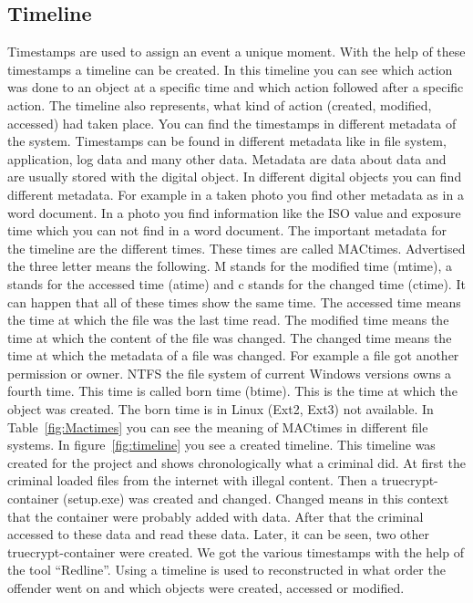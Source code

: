 
\subsection{Timeline}

Timestamps are used to assign an event a unique moment. With the help of these timestamps a timeline can be created. In this timeline you can see which action was done to an object at a specific time and which action followed after a specific action. The timeline also  represents, what kind of action (created, modified, accessed) had taken place. You can find the timestamps in different metadata of the system. Timestamps can be found in different metadata like in file system, application, log data and many other data. Metadata are data about data and are usually stored with the digital object. In different digital objects you can find different metadata. For example in a taken photo you find other metadata as in a word document. In a photo you find information like the ISO value and exposure time which you can not find in a word document. The important metadata for the timeline are the different times. These times are called MACtimes. Advertised the three letter means the following. M stands for the modified time (mtime), a  stands for the accessed time (atime) and c stands for the changed time (ctime). It can happen that all of these times show the same time. The accessed time means the time at which the file was the last time read. The modified time means the time at which the content of the file was changed. The changed time means the time at which the metadata of a file was changed. For example a file got another permission or owner. NTFS the file system of current Windows versions owns a fourth time. This time is called born time (btime). This is the time at which the object was created. The born time is in Linux (Ext2, Ext3) not available. In Table~\ref{fig:Mactimes} you can see the meaning of MACtimes in different file systems. In figure~\ref{fig:timeline} you see a created timeline. This timeline was created for the project and shows chronologically what a criminal did. At first the criminal loaded files from the internet with illegal content. Then a truecrypt-container (setup.exe) was created and changed. Changed means in this context that the container were probably added with data. After that the criminal accessed to these data and read these data. Later, it can be seen, two other truecrypt-container were created. We got the various timestamps with the help of the tool “Redline”. Using a timeline is used to reconstructed in what order the offender went on and which objects were created, accessed or modified.

